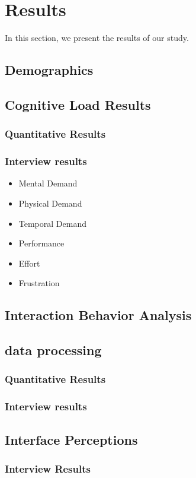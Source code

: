 \section{Results}
In this section, we present the results of our study.

\subsection{Demographics}
\subsection{Cognitive Load Results}

\subsubsection*{Quantitative Results}

\subsubsection*{Interview results}
\begin{itemize}
    \renewcommand{\labelitemi}{} %
    \renewcommand{\labelitemii}{} %
    \renewcommand{\labelitemiii}{} %
    \renewcommand{\labelitemiv}{} %
    \item Mental Demand
    \item Physical Demand
    \item Temporal Demand
    \item Performance
    \item Effort
    \item Frustration
\end{itemize}

\subsection{Interaction Behavior Analysis}
\subsection*{data processing}

\subsubsection*{Quantitative Results}

\subsubsection*{Interview results}


\subsection{Interface Perceptions}

\subsubsection*{Interview Results}

